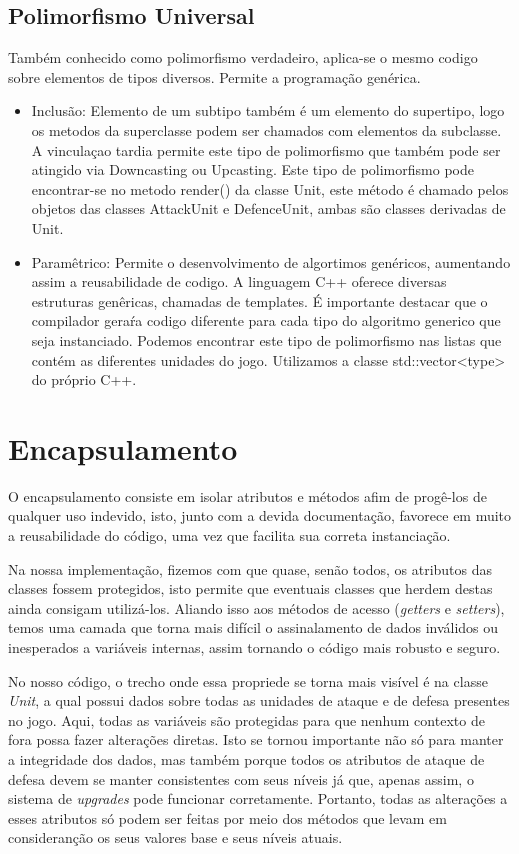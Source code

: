 \documentclass[rel_mlp]{iiufrgs}
\begin{document}
\subsection{Polimorfismo Universal}
 Também conhecido como polimorfismo verdadeiro, aplica-se o mesmo codigo sobre elementos de tipos diversos. Permite a programação genérica.
  \begin{itemize}
	\item Inclusão: Elemento de um subtipo também é um elemento do supertipo, logo os metodos da superclasse podem ser chamados com elementos da subclasse. A vinculaçao tardia permite este tipo de polimorfismo que também pode ser atingido via Downcasting ou Upcasting. 
	Este tipo de polimorfismo pode encontrar-se no metodo render() da classe Unit, este método é chamado pelos objetos das classes AttackUnit e DefenceUnit, ambas são classes derivadas de Unit.
	\item Paramêtrico: Permite o desenvolvimento de algortimos genéricos, aumentando assim a reusabilidade de codigo. A linguagem C++ oferece diversas estruturas genêricas, chamadas de templates. É importante destacar que o compilador geraŕa codigo diferente para cada tipo do algoritmo generico  que seja instanciado. Podemos encontrar este tipo de polimorfismo nas listas que contém as diferentes unidades do jogo. Utilizamos a classe std::vector<type> do próprio C++. 
 \end{itemize}   
 
 
\section{Encapsulamento} 
 
	O encapsulamento consiste em isolar atributos e métodos afim de progê-los de qualquer uso indevido, isto, junto com a devida documentação, favorece em muito a reusabilidade do código, uma vez que facilita sua correta instanciação.
	
	Na nossa implementação, fizemos com que quase, senão todos, os atributos das classes fossem protegidos, isto permite que eventuais classes que herdem destas ainda consigam utilizá-los. Aliando isso aos métodos de acesso (\textit{getters} e \textit{setters}), temos uma camada que torna mais difícil o assinalamento de dados inválidos ou inesperados a variáveis internas, assim tornando o código mais robusto e seguro.
	
 	No nosso código, o trecho onde essa propriede se torna mais visível é na classe \textit{Unit}, a qual possui dados sobre todas as unidades de ataque e de defesa presentes no jogo. Aqui, todas as variáveis são protegidas para que nenhum contexto de fora possa fazer alterações diretas. Isto se tornou importante não só para manter a integridade dos dados, mas também porque todos os atributos de ataque de defesa devem se manter consistentes com seus níveis já que, apenas assim, o sistema de \textit{upgrades} pode funcionar corretamente. Portanto, todas as alterações a esses atributos só podem ser feitas por meio dos métodos que levam em consideranção os seus valores base e seus níveis atuais.
 	
\end{document}
